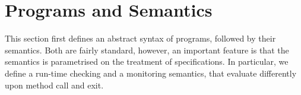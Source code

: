 \section{Programs and Semantics}\label{SecProgram}

This section first defines an abstract syntax of programs, followed by
their semantics. Both are fairly standard, however, an important
feature is that the semantics is parametrised on the treatment of
specifications. In particular, we define a run-time checking and a
monitoring semantics, that evaluate differently upon method call and
exit.


